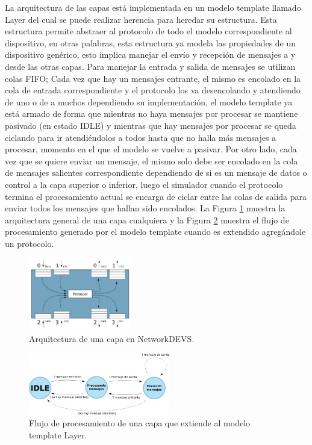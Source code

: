 \documentclass[10pt,a4paper]{article}
\begin{document}
La arquitectura de las capas está implementada en un modelo template llamado Layer del cual se puede realizar herencia para heredar su estructura. Esta estructura permite abstraer al protocolo de todo el modelo correspondiente al dispositivo, en otras palabras, esta estructura ya modela las propiedades de un dispositivo genérico, esto implica manejar el envío y recepción de mensajes a y desde las otras capas. Para manejar la entrada y salida de mensajes se utilizan colas FIFO; Cada vez que hay un mensajes entrante, el mismo es encolado en la cola de entrada correspondiente y el protocolo los va desencolando y atendiendo de uno o de a muchos dependiendo su implementación, el modelo template ya está armado de forma que mientras no haya mensajes por procesar se mantiene pasivado (en estado IDLE) y mientras que hay mensajes por procesar se queda ciclando para ir atendiéndolos a todos hasta que no halla más mensajes a procesar, momento en el que el modelo se vuelve a pasivar. Por otro lado, cada vez que se quiere enviar un mensaje, el mismo solo debe ser encolado en la cola de mensajes salientes correspondiente dependiendo de si es un mensaje de datos o control a la capa superior o inferior, luego el simulador cuando el protocolo termina el procesamiento actual se encarga de ciclar entre las colas de salida para enviar todos los mensajes que hallan sido encolados. La Figura \ref{figure:layer general architecture} muestra la arquitectura general de una capa cualquiera y la Figura \ref{figure:processing flow} muestra el flujo de procesamiento generado por el modelo template cuando es extendido agregándole un protocolo.

\begin{figure}[t]
    \centering
    \includegraphics[width = 0.4\textwidth]{img/png/layer_architecture.png}
    \caption{Arquitectura de una capa en NetworkDEVS.}
    \label{figure:layer general architecture}
\end{figure}

\begin{figure}[t]
    \centering
    \includegraphics[width = 0.55\textwidth]{img/png/processing_flow.png}
    \caption{Flujo de procesamiento de una capa que extiende al modelo template Layer.}
    \label{figure:processing flow}
\end{figure}
\end{document}
